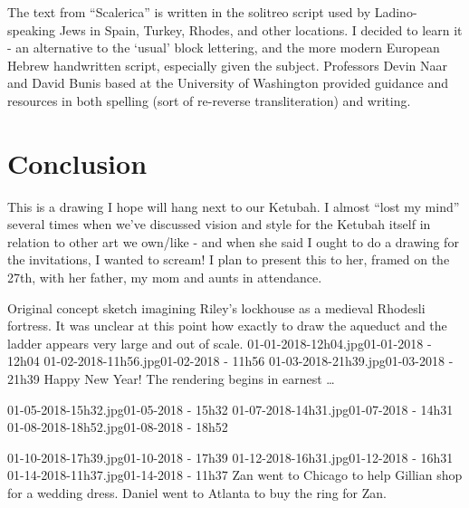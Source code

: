 ﻿\documentclass[letterpaper, 12pt, landscape]{ProgressBook}
\begin{document}
The text from ``Scalerica'' is written in the solitreo script used
by Ladino-speaking Jews in Spain, Turkey, Rhodes, and other locations. I
decided to learn it - an alternative to the ‘usual’ block lettering, and the
more modern European Hebrew handwritten script, especially given the subject.
Professors Devin Naar and David Bunis based at the University of Washington
provided guidance and resources in both spelling (sort of re-reverse
transliteration) and writing.

\section*{Conclusion}

This is a drawing I hope will hang next to our Ketubah. I almost
``lost my mind'' several times when we've discussed vision and style for the
Ketubah itself in relation to other art we own/like - and when she said I ought to do a drawing for the invitations, I wanted to scream! I plan to present this to
her, framed on the 27th, with her father, my mom and aunts in attendance.

\eject

{Original concept sketch imagining Riley's lockhouse as a medieval Rhodesli fortress. It was unclear at this point how exactly to draw the aqueduct and the ladder appears very large and out of scale.}
{01-01-2018-12h04.jpg}{01-01-2018 - 12h04}
{01-02-2018-11h56.jpg}{01-02-2018 - 11h56}
{01-03-2018-21h39.jpg}{01-03-2018 - 21h39}
{Happy New Year! The rendering begins in earnest \ldots}

{01-05-2018-15h32.jpg}{01-05-2018 - 15h32}
{01-07-2018-14h31.jpg}{01-07-2018 - 14h31}
{01-08-2018-18h52.jpg}{01-08-2018 - 18h52}

{01-10-2018-17h39.jpg}{01-10-2018 - 17h39}
{01-12-2018-16h31.jpg}{01-12-2018 - 16h31}
{01-14-2018-11h37.jpg}{01-14-2018 - 11h37}
{Zan went to Chicago to help Gillian shop for a wedding dress. Daniel went to Atlanta to buy the ring for Zan.}
\end{document}
